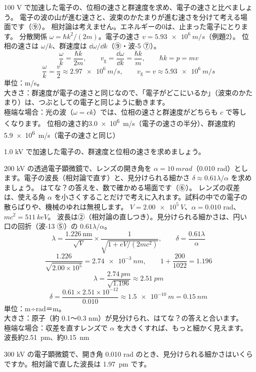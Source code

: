 \label{ph:原-3:ex11}
\begin{phreidai}[電子の波の位相の速さと群速度]
100 V で加速した電子の、位相の速さと群速度を求め、電子の速さと比べましょう。
\phbamen
電子の波の山が進む速さと、波束のかたまりが進む速さを分けて考える場面です（⑨）。
\phmushi
相対論は考えません。エネルギーの0は、止まった電子にとります。
\phzu
分散関係 $\omega=\hbar k^2/(2m)$。電子の速さ $v=\qty{5.93e6}{m/s}$（例題2）。
\phriyu
位相の速さは $\omega/k$、群速度は $\dd\omega/\dd k$（⑨・波-5 ⑦）。
\phtateru
\[ \frac{\omega}{k}=\frac{\hbar k}{2m},\qquad v_{\mathrm g}=\frac{\dd\omega}{\dd k}=\frac{\hbar k}{m},\qquad\hbar k=p=mv \]
\phtoku
\[ \frac{\omega}{k}=\frac{v}{2}\approx\qty{2.97e6}{m/s},\qquad v_{\mathrm g}=v\approx\qty{5.93e6}{m/s} \]
\phtashikame
単位：m/s。\\
大きさ：群速度が電子の速さと同じなので、「電子がどこにいるか」（波束のかたまり）は、つぶとしての電子と同じように動きます。\\
極端な場合：光の波（$\omega=ck$）では、位相の速さと群速度がどちらも $c$ で等しくなります。
\kotae 位相の速さ約\qty{3.0e6}{m/s}（電子の速さの半分）、群速度約\qty{5.9e6}{m/s}（電子の速さと同じ）
\end{phreidai}
\begin{jibun}
1.0 kV で加速した電子の、群速度と位相の速さを求めましょう。
\end{jibun}

\label{ph:原-3:ex12}
\begin{phreidai}[電子顕微鏡で見分けられる細かさ]
200 kV の透過電子顕微鏡で、レンズの開き角を $\alpha=\qty{10}{mrad}$（0.010 rad）とします。電子の波長（相対論で直す）と、見分けられる細かさ $\delta\approx0.61\lambda/\alpha$ を求めましょう。
\phbamen
はてな？の答えを、数で確かめる場面です（⑥）。
\phmushi
レンズの収差は、使える角 $\alpha$ を小さくすることだけで考えに入れます。試料の中での電子の散らばりや、機械のゆれは無視します。
\phzu
$V=\qty{2.00e5}{V}$、$\alpha=0.010$ rad、$mc^2=\qty{511}{keV}$。
\phriyu
波長は②（相対論の直しつき）。見分けられる細かさは、円い口の回折（波-13 ⑤）の $0.61\lambda/\alpha$。
\phtateru
\[ \lambda=\frac{1.226\ \mathrm{nm}}{\sqrt{V}}\times\frac{1}{\sqrt{1+eV/(2mc^2)}},\qquad\delta=\frac{0.61\lambda}{\alpha} \]
\phtoku
\[ \frac{1.226}{\sqrt{2.00\times10^5}}=\qty{2.74e-3}{nm},\qquad1+\frac{200}{1022}=1.196 \]
\[ \lambda=\frac{\qty{2.74}{pm}}{\sqrt{1.196}}\approx\qty{2.51}{pm} \]
\[ \delta=\frac{0.61\times2.51\times10^{-12}}{0.010}\approx\qty{1.5e-10}{m}=\qty{0.15}{nm} \]
\phtashikame
単位：m÷rad＝m。\\
大きさ：原子（約 0.1〜0.3 nm）が見分けられ、はてな？の答えと合います。\\
極端な場合：収差を直すレンズで $\alpha$ を大きくすれば、もっと細かく見えます。
\kotae 波長約\qty{2.51}{pm}、約\qty{0.15}{nm}
\end{phreidai}
\begin{jibun}
300 kV の電子顕微鏡で、開き角 0.010 rad のとき、見分けられる細かさはいくらですか。相対論で直した波長は \qty{1.97}{pm} です。
\end{jibun}

